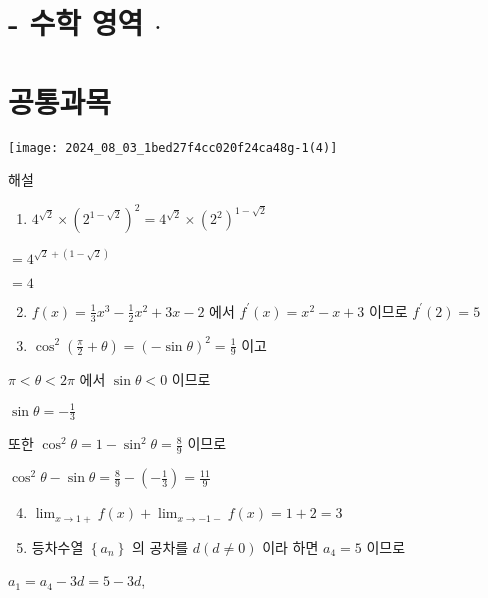 \documentclass[10pt]{article}
\begin{document}
\section*{- 수학 영역 \(\cdot\)}
\section*{공통과목}
\begin{center}
\texttt{[image: 2024\_08\_03\_1bed27f4cc020f24ca48g-1(4)]}
\end{center}

해설

\begin{enumerate}
  \item \(4^{\sqrt{2}} \times\left(2^{1-\sqrt{2}}\right)^{2}=4^{\sqrt{2}} \times\left(2^{2}\right)^{1-\sqrt{2}}\)
\end{enumerate}

\(=4^{\sqrt{2}+(1-\sqrt{2})}\)

\(=4\)

\begin{enumerate}
  \setcounter{enumi}{1}
  \item \(f(x)=\frac{1}{3} x^{3}-\frac{1}{2} x^{2}+3 x-2\) 에서 \(f^{\prime}(x)=x^{2}-x+3\) 이므로 \(f^{\prime}(2)=5\)

  \item \(\cos ^{2}\left(\frac{\pi}{2}+\theta\right)=(-\sin \theta)^{2}=\frac{1}{9}\) 이고

\end{enumerate}

\(\pi<\theta<2 \pi\) 에서 \(\sin \theta<0\) 이므로

\(\sin \theta=-\frac{1}{3}\)

또한 \(\cos ^{2} \theta=1-\sin ^{2} \theta=\frac{8}{9}\) 이므로

\(\cos ^{2} \theta-\sin \theta=\frac{8}{9}-\left(-\frac{1}{3}\right)=\frac{11}{9}\)

\begin{enumerate}
  \setcounter{enumi}{3}
  \item \(\lim _{x \rightarrow 1+} f(x)+\lim _{x \rightarrow-1-} f(x)=1+2=3\)

  \item 등차수열 \(\left\{a_{n}\right\}\) 의 공차를 \(d(d \neq 0)\) 이라 하면 \(a_{4}=5\) 이므로

\end{enumerate}

\(a_{1}=a_{4}-3 d=5-3 d\),
\end{document}
